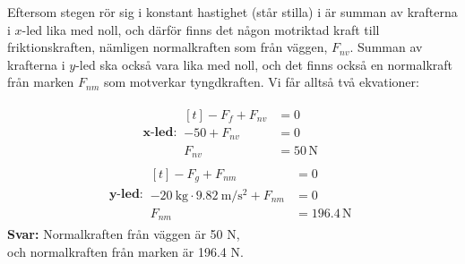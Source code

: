 \documentclass[11pt]{article}
\begin{document}
\begin{enumerate}[itemsep=2em]
\begin{minipage}[t]{0.5\textwidth}
                      Eftersom stegen rör sig i konstant hastighet (står stilla) i är summan av krafterna i $x$-led lika med noll, och därför finns det någon motriktad kraft till friktionskraften, nämligen normalkraften som från väggen, $F_{nv}$. Summan av krafterna i $y$-led ska också vara lika med noll, och det finns också en normalkraft från marken $F_{nm}$ som motverkar tyngdkraften. Vi får alltså två ekvationer:

              \end{minipage}
              \hfill
              \begin{adjustbox}{valign=t}
                      
              \end{adjustbox}
              \begin{align*}
                      \textbf{x-led}: \begin{aligned}[t]
                                              -F_f + F_{nv} & = 0              \\
                                              -50 + F_{nv}  & = 0              \\
                                              F_{nv}        & = 50\,\mathrm{N}
                                      \end{aligned}
              \end{align*}
              \begin{align*}
                      \textbf{y-led}: \begin{aligned}[t]
                                              -F_g + F_{nm}                                                        & = 0                 \\
                                              -\SI{20}{\kilogram} \cdot \SI{9.82}{\meter/\second\squared} + F_{nm} & = 0                 \\
                                              F_{nm}                                                               & = 196.4\,\mathrm{N}
                                      \end{aligned}
              \end{align*}
              \textbf{Svar:} Normalkraften från väggen är 50 N, \\ och normalkraften från marken är 196.4 N.


\end{enumerate}
\end{document}
